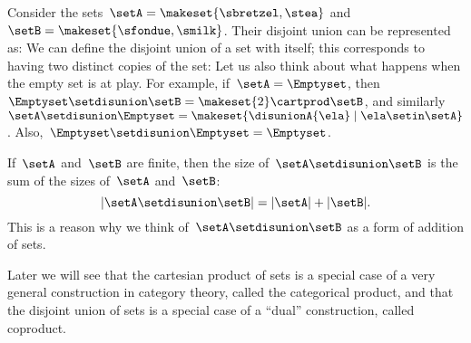 

Consider the sets~$\setA=\makeset{\sbretzel, \stea}$ and~$\setB=\makeset{\sfondue, \smilk}$.
Their disjoint union can be represented as:
%
%
We can define the disjoint union of a set with itself; this corresponds to having two distinct copies of the set:
%
%
Let us also think about what happens when the empty set is at play.
For example, if~$\setA = \Emptyset$, then~$\Emptyset \setdisunion \setB =  \makeset{2} \cartprod \setB$, and similarly~$\setA \setdisunion \Emptyset =  \makeset{ \disunionA{\ela} \mid \ela \setin\setA }$.
Also,~$\Emptyset \setdisunion \Emptyset = \Emptyset$.

\begin{remark}
    If~$\setA$ and~$\setB$ are finite, then the size of~$\setA \setdisunion \setB$ is the sum of the sizes of~$\setA$ and~$\setB$:
    \begin{equation}
        \vert \setA \setdisunion \setB \vert = \vert \setA \vert + \vert \setB \vert.
    \end{equation}
    This is a reason why we think of~$\setA \setdisunion \setB$ as a form of addition of sets.
\end{remark}

\begin{remark}
    Later we will see that the cartesian product of sets is a special case of a very general construction in category theory, called the categorical product, and that the disjoint union of sets is a special case of a ``dual'' construction, called coproduct.
\end{remark}
